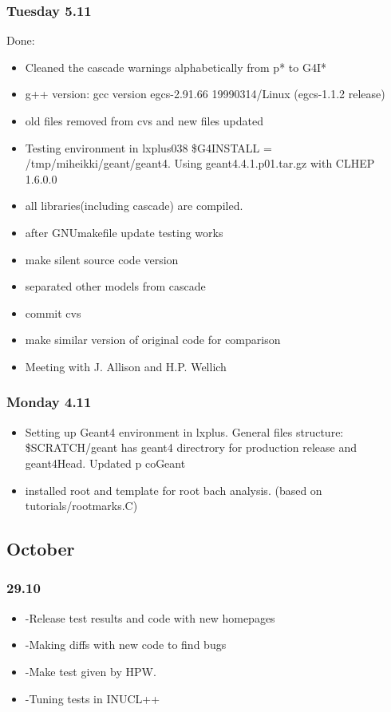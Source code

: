 \subsubsection{Tuesday 5.11}

Done:
\begin{itemize}
\item Cleaned the cascade warnings alphabetically from p* to G4I*
\item g++ version: gcc version egcs-2.91.66 19990314/Linux (egcs-1.1.2
  release)
\item old files removed from cvs and new files updated
\item Testing environment in lxplus038 \$G4INSTALL =
  /tmp/miheikki/geant/geant4. Using geant4.4.1.p01.tar.gz with CLHEP
  1.6.0.0
\item all libraries(including cascade) are compiled.
\item after GNUmakefile update testing works
\item make silent source code version
\item separated other models from cascade
\item commit cvs
\item make similar version of original code for comparison
\item Meeting with J. Allison and H.P. Wellich

\end{itemize}

\subsubsection{Monday 4.11}
\begin{itemize}
\item Setting up Geant4 environment in lxplus. General files
  structure: \$SCRATCH/geant has geant4 directrory for production
  release and geant4Head. Updated p coGeant
\item installed root and template for root bach analysis. (based on
  tutorials/rootmarks.C)
\end{itemize}


\subsection{October}

\subsubsection{29.10}
\begin{itemize}
\item -Release test results and code with new homepages
\item -Making diffs with new code to find bugs
\item -Make test given by HPW.
\item -Tuning tests in INUCL++
\end{itemize}

